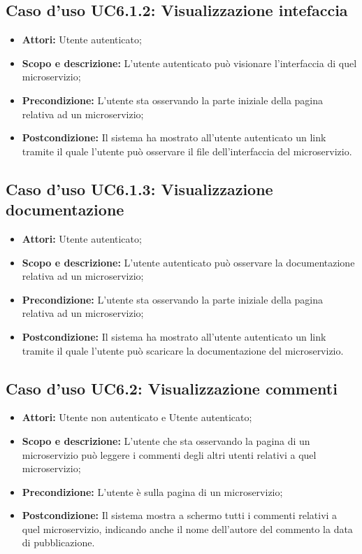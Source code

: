 \documentclass[12pt,a4paper,titlepage]{article}
\begin{document}
	\subsection{Caso d'uso UC6.1.2: Visualizzazione intefaccia}
	\label{UC6.1.2}
	\begin{itemize}
		\item \textbf{Attori: }Utente autenticato;
		\item \textbf{Scopo e descrizione: }L'utente autenticato può visionare l'interfaccia di quel microservizio;
		\item \textbf{Precondizione: }L'utente sta osservando la parte iniziale della pagina relativa ad un microservizio;
		\item \textbf{Postcondizione: }Il sistema ha mostrato all'utente autenticato un link tramite il quale l'utente può osservare il file dell'interfaccia del microservizio.
	\end{itemize}
	\subsection{Caso d'uso UC6.1.3: Visualizzazione documentazione}
	\label{UC6.1.3}
	\begin{itemize}
		\item \textbf{Attori: }Utente autenticato;
		\item \textbf{Scopo e descrizione: }L'utente autenticato può osservare la documentazione relativa ad un microservizio;
		\item \textbf{Precondizione: }L'utente sta osservando la parte iniziale della pagina relativa ad un microservizio;
		\item \textbf{Postcondizione: }Il sistema ha mostrato all'utente autenticato un link tramite il quale l'utente può scaricare la documentazione del microservizio.
	\end{itemize}
	\subsection{Caso d'uso UC6.2: Visualizzazione commenti}
	\label{UC6.2}
	\begin{itemize}
		\item \textbf{Attori: }Utente non autenticato e Utente autenticato;
		\item \textbf{Scopo e descrizione: }L'utente che sta osservando la pagina di un microservizio può leggere i commenti degli altri utenti relativi a quel microservizio;
		\item \textbf{Precondizione: }L'utente è sulla pagina di un microservizio;
		\item \textbf{Postcondizione: }Il sistema mostra a schermo tutti i commenti relativi a quel microservizio, indicando anche il nome dell'autore del commento la data di pubblicazione.
	\end{itemize}
\end{document}
